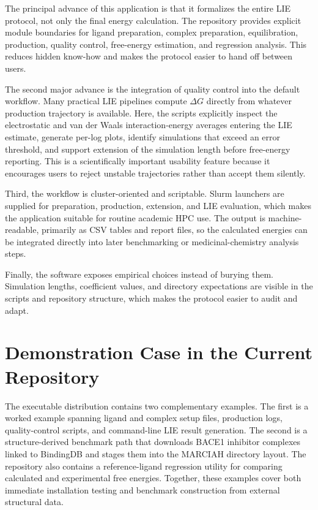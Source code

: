\documentclass[journal=jcisd8,manuscript=article]{achemso}
\begin{document}
The principal advance of this application is that it formalizes the entire LIE protocol, not only the final energy calculation. The repository provides explicit module boundaries for ligand preparation, complex preparation, equilibration, production, quality control, free-energy estimation, and regression analysis. This reduces hidden know-how and makes the protocol easier to hand off between users.

The second major advance is the integration of quality control into the default workflow. Many practical LIE pipelines compute \(\Delta G\) directly from whatever production trajectory is available. Here, the scripts explicitly inspect the electrostatic and van der Waals interaction-energy averages entering the LIE estimate, generate per-log plots, identify simulations that exceed an error threshold, and support extension of the simulation length before free-energy reporting. This is a scientifically important usability feature because it encourages users to reject unstable trajectories rather than accept them silently.

Third, the workflow is cluster-oriented and scriptable. Slurm launchers are supplied for preparation, production, extension, and LIE evaluation, which makes the application suitable for routine academic HPC use. The output is machine-readable, primarily as CSV tables and report files, so the calculated energies can be integrated directly into later benchmarking or medicinal-chemistry analysis steps.

Finally, the software exposes empirical choices instead of burying them. Simulation lengths, coefficient values, and directory expectations are visible in the scripts and repository structure, which makes the protocol easier to audit and adapt.

\section{Demonstration Case in the Current Repository}

The executable distribution contains two complementary examples. The first is a worked example spanning ligand and complex setup files, production logs, quality-control scripts, and command-line LIE result generation. The second is a structure-derived benchmark path that downloads BACE1 inhibitor complexes linked to BindingDB and stages them into the MARCIAH directory layout. The repository also contains a reference-ligand regression utility for comparing calculated and experimental free energies. Together, these examples cover both immediate installation testing and benchmark construction from external structural data.
\end{document}
